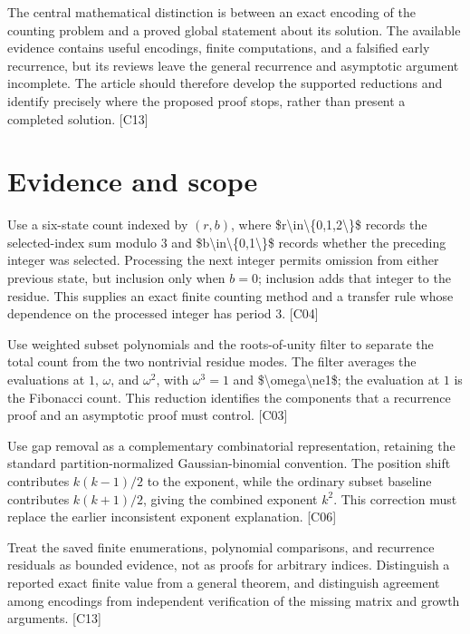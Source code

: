 \documentclass[11pt]{article}
\begin{document}
The central mathematical distinction is between an exact encoding of the counting problem and a proved global statement about its solution. The available evidence contains useful encodings, finite computations, and a falsified early recurrence, but its reviews leave the general recurrence and asymptotic argument incomplete. The article should therefore develop the supported reductions and identify precisely where the proposed proof stops, rather than present a completed solution. [C13]

\section{Evidence and scope}
Use a six-state count indexed by $(r,b)$, where \$r\textbackslash{}in\textbackslash{}\{0,1,2\textbackslash{}\}\$ records the selected-index sum modulo $3$ and \$b\textbackslash{}in\textbackslash{}\{0,1\textbackslash{}\}\$ records whether the preceding integer was selected. Processing the next integer permits omission from either previous state, but inclusion only when $b=0$; inclusion adds that integer to the residue. This supplies an exact finite counting method and a transfer rule whose dependence on the processed integer has period $3$. [C04]

Use weighted subset polynomials and the roots-of-unity filter to separate the total count from the two nontrivial residue modes. The filter averages the evaluations at $1$, $\omega$, and $\omega^2$, with $\omega^3=1$ and \$\textbackslash{}omega\textbackslash{}ne1\$; the evaluation at $1$ is the Fibonacci count. This reduction identifies the components that a recurrence proof and an asymptotic proof must control. [C03]

Use gap removal as a complementary combinatorial representation, retaining the standard partition-normalized Gaussian-binomial convention. The position shift contributes $k(k-1)/2$ to the exponent, while the ordinary subset baseline contributes $k(k+1)/2$, giving the combined exponent $k^2$. This correction must replace the earlier inconsistent exponent explanation. [C06]

Treat the saved finite enumerations, polynomial comparisons, and recurrence residuals as bounded evidence, not as proofs for arbitrary indices. Distinguish a reported exact finite value from a general theorem, and distinguish agreement among encodings from independent verification of the missing matrix and growth arguments. [C13]
\end{document}
